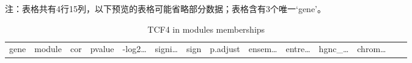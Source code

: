 \documentclass[
]{article}
\begin{document}
\begin{center}\begin{tcolorbox}[colback=gray!10, colframe=gray!50, width=0.9\linewidth, arc=1mm, boxrule=0.5pt]注：表格共有4行15列，以下预览的表格可能省略部分数据；表格含有3个唯一`gene'。
\end{tcolorbox}
\end{center}

\begin{longtable}[]{@{}llllllllllllll@{}}
\caption{\label{tab:TCF4-in-modules-memberships}TCF4 in modules memberships}\tabularnewline
\toprule
\begin{minipage}[b]{0.05\columnwidth}\raggedright
gene\strut
\end{minipage} & \begin{minipage}[b]{0.04\columnwidth}\raggedright
module\strut
\end{minipage} & \begin{minipage}[b]{0.04\columnwidth}\raggedright
cor\strut
\end{minipage} & \begin{minipage}[b]{0.04\columnwidth}\raggedright
pvalue\strut
\end{minipage} & \begin{minipage}[b]{0.05\columnwidth}\raggedright
-log2\ldots{}\strut
\end{minipage} & \begin{minipage}[b]{0.05\columnwidth}\raggedright
signi\ldots{}\strut
\end{minipage} & \begin{minipage}[b]{0.03\columnwidth}\raggedright
sign\strut
\end{minipage} & \begin{minipage}[b]{0.05\columnwidth}\raggedright
p.adjust\strut
\end{minipage} & \begin{minipage}[b]{0.05\columnwidth}\raggedright
ensem\ldots{}\strut
\end{minipage} & \begin{minipage}[b]{0.05\columnwidth}\raggedright
entre\ldots{}\strut
\end{minipage} & \begin{minipage}[b]{0.05\columnwidth}\raggedright
hgnc\_\ldots{}\strut
\end{minipage} & \begin{minipage}[b]{0.05\columnwidth}\raggedright
chrom\ldots{}\strut
\end{minipage} & \begin{minipage}[b]{0.05\columnwidth}\raggedright

\end{minipage}
\end{longtable}
\end{document}
